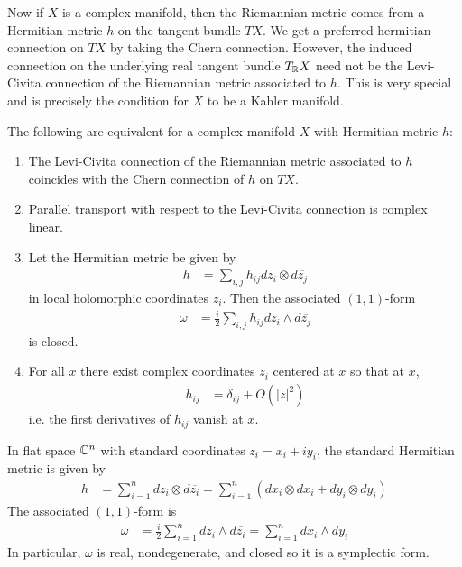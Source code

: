 \documentclass[12pt]{article}
\begin{document}
Now if $X$ is a complex manifold, then the Riemannian metric comes from a Hermitian metric $h$ on the tangent bundle $TX$. We get a preferred hermitian connection on $TX$ by taking the Chern connection. However, the induced connection on the underlying real tangent bundle $T_{\mathbb{R}} X$ need not be the Levi-Civita connection of the Riemannian metric associated to $h$. This is very special and is precisely the condition for $X$ to be a Kahler manifold.

\begin{theorem}
    The following are equivalent for a complex manifold $X$ with Hermitian metric $h$:
    \begin{enumerate}
        \item The Levi-Civita connection of the Riemannian metric associated to $h$ coincides with the Chern connection of $h$ on $TX$.
        \item Parallel transport with respect to the Levi-Civita connection is complex linear.
        \item Let the Hermitian metric be given by \begin{align*}
            h & = \sum_{i,j} h_{ij} d z_i \otimes d \overline{z_j}
        \end{align*} in local holomorphic coordinates $z_i$. Then the associated $(1,1)$-form \begin{align*}
            \omega & = \frac{i}{2} \sum_{i,j} h_{ij} d z_i \wedge d \overline{z_j}
        \end{align*} is closed.
        \item For all $x$ there exist complex coordinates $z_i$ centered at $x$ so that at $x$, \begin{align*}
            h_{ij} & = \delta_{ij} + O(|z|^2)
        \end{align*} i.e. the first derivatives of $h_{ij}$ vanish at $x$.
    \end{enumerate}
\end{theorem}

\begin{remark}
    In flat space $\mathbb{C}^n$ with standard coordinates $z_i = x_i + i y_i$, the standard Hermitian metric is given by \begin{align*}
        h & = \sum_{i=1}^n d z_i \otimes d \overline{z_i} = \sum_{i=1}^n (d x_i \otimes d x_i + d y_i \otimes d y_i)
    \end{align*} The associated $(1,1)$-form is \begin{align*}
        \omega & = \frac{i}{2} \sum_{i=1}^n d z_i \wedge d \overline{z_i} = \sum_{i=1}^n d x_i \wedge d y_i
    \end{align*} In particular, $\omega$ is real, nondegenerate, and closed so it is a symplectic form. 
\end{remark}
\end{document}
